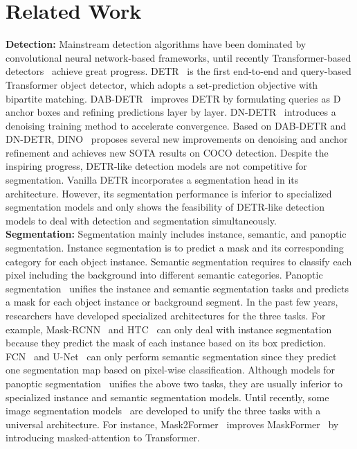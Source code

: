 \documentclass[10pt,twocolumn,letterpaper]{article}
\begin{document}
\section{Related Work}
\noindent\textbf{Detection:} 
Mainstream detection algorithms have been dominated by convolutional neural network-based frameworks, until recently Transformer-based detectors~\cite{carion2020end,liu2022dab,li2022dn,zhang2022dino} achieve great progress. DETR~\cite{carion2020end} is the first end-to-end and query-based Transformer object detector, which adopts a set-prediction objective with bipartite matching. DAB-DETR~\cite{liu2022dab} improves DETR by formulating queries as D anchor boxes and refining predictions layer by layer. DN-DETR~\cite{li2022dn} introduces a denoising training method to accelerate convergence. 
Based on DAB-DETR and DN-DETR, DINO~\cite{zhang2022dino} proposes several new improvements on denoising and anchor refinement and achieves new SOTA results on COCO detection. Despite the inspiring progress, DETR-like detection models are not competitive for segmentation. Vanilla DETR incorporates a segmentation head in its architecture. However, its segmentation performance is inferior to specialized segmentation models and only shows the feasibility of DETR-like detection models to deal with detection and segmentation simultaneously.
\\\textbf{Segmentation:}
Segmentation mainly includes instance, semantic, and panoptic segmentation. 
Instance segmentation is to predict a mask and its corresponding category for each object instance. Semantic segmentation requires to classify each pixel including the background into different semantic categories. Panoptic segmentation~\cite{kirillov2019panoptic} unifies the instance and semantic segmentation tasks and predicts a mask for each object instance or background segment. In the past few years, researchers have developed specialized architectures for the three tasks. For example, Mask-RCNN~\cite{he2017mask} and HTC~\cite{chen2019hybrid} can only deal with instance segmentation because they predict the mask of each instance based on its box prediction. FCN~\cite{long2015fully} and U-Net~\cite{ronneberger2015u} can only perform semantic segmentation since they predict one segmentation map based on pixel-wise classification. Although models for panoptic segmentation~\cite{kirillov2019pafpn,xiong2019upsnet} unifies the above two tasks, they are usually inferior to specialized instance and semantic segmentation models. Until recently, some  image segmentation models~\cite{zhang2021k,cheng2021maskformer, cheng2021mask2former} are developed to unify the three tasks with a universal architecture. For instance, Mask2Former~\cite{cheng2021mask2former} improves MaskFormer~\cite{cheng2021maskformer} by introducing masked-attention to Transformer.
\end{document}
